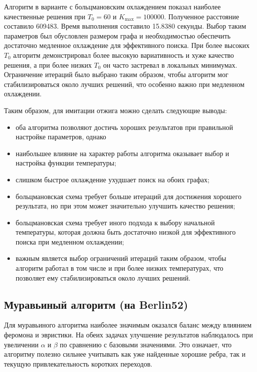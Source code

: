\documentclass[12pt,a4paper]{article}
\begin{document}
Алгоритм в варианте с больцмановским охлаждением показал наиболее качественные решения при
$T_0=60$ и $K_{\max}=100000$. Полученное расстояние составило 609483. Время выполнения
составило 15.8380 секунды. Выбор таким параметров был обусловлен размером графа и
необходимостью обеспечить достаточно медленное охлаждение для эффективного поиска.
При более высоких $T_0$ алгоритм демонстрировал более высокую вариативность и хуже
качество решения, а при более низких $T_0$ он часто застревал в локальных минимумах.
Ограничение итераций было выбрано таким образом, чтобы алгоритм мог стабилизироваться
около лучших решений, что особенно важно при медленном охлаждении.

Таким образом, для имитации отжига можно сделать следующие выводы:
\begin{itemize}
    \item оба алгоритма позволяют достичь хороших результатов при правильной настройке параметров, однако
    \item наибольшее влияние на характер работы алгоритма оказывает выбор и настройка функции температуры;
    \item слишком быстрое охлаждение ухудшает поиск на обоих графах;
    \item больцмановская схема требует больше итераций для достижения хорошего результата, но при этом может значительно улучшить качество решения;
    \item больцмановская схема требует иного подхода к выбору начальной температуры, которая должна быть достаточно низкой для эффективного поиска при медленном охлаждении;
    \item важным является выбор ограничений итераций таким образом, чтобы алгоритм
работал в том числе и при более низких температурах, что позволяет ему стабилизироваться около лучших решений.
\end{itemize}

\subsection{Муравьиный алгоритм (на Berlin52)}

Для муравьиного алгоритма наиболее значимым оказался баланс между влиянием феромона
и эвристики. На обеих задачах улучшение результатов наблюдалось при увеличении
$\alpha$ и $\beta$ по сравнению с базовыми значениями. Это означает, что алгоритму
полезно сильнее учитывать как уже найденные хорошие ребра, так и текущую привлекательность
коротких переходов.
\end{document}

